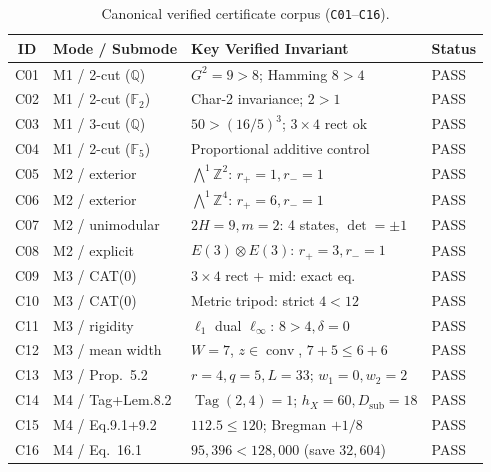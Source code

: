\documentclass[10pt,twocolumn]{article}
\begin{document}
\begin{table}[t]
\centering
\scriptsize
\setlength{\tabcolsep}{3.5pt}
\caption{Canonical verified certificate corpus (\texttt{C01}--\texttt{C16}).}
\label{tab:corpus}
\begin{tabular}{@{}clll@{}}
\toprule
ID & Mode / Submode & Key Verified Invariant & Status \\
\midrule
C01 & M1 / 2-cut ($\mathbb{Q}$) & $G^2=9>8$; Hamming $8>4$ & PASS \\
C02 & M1 / 2-cut ($\mathbb{F}_2$) & Char-2 invariance; $2>1$ & PASS \\
C03 & M1 / 3-cut ($\mathbb{Q}$) & $50 > (16/5)^3$; $3\times 4$ rect ok & PASS \\
C04 & M1 / 2-cut ($\mathbb{F}_5$) & Proportional additive control & PASS \\
C05 & M2 / exterior & $\bigwedge^1\mathbb{Z}^2$: $r_+=1, r_-=1$ & PASS \\
C06 & M2 / exterior & $\bigwedge^1\mathbb{Z}^4$: $r_+=6, r_-=1$ & PASS \\
C07 & M2 / unimodular & $2H{=}9,m{=}2$: 4 states, $\det=\pm 1$ & PASS \\
C08 & M2 / explicit & $E(3){\otimes}E(3)$: $r_+=3, r_-=1$ & PASS \\
C09 & M3 / CAT(0) & $3\times 4$ rect + mid: exact eq. & PASS \\
C10 & M3 / CAT(0) & Metric tripod: strict $4 < 12$ & PASS \\
C11 & M3 / rigidity & $\ell_1$ dual $\ell_\infty$: $8>4, \delta=0$ & PASS \\
C12 & M3 / mean width & $W=7$, $z\in\operatorname{conv}$, $7{+}5\le 6{+}6$ & PASS \\
C13 & M3 / Prop.~5.2 & $r{=}4,q{=}5,L{=}33$; $w_1{=}0,w_2{=}2$ & PASS \\
C14 & M4 / Tag+Lem.8.2 & $\operatorname{Tag}(2,4)=1$; $h_X{=}60, D_{\mathrm{sub}}{=}18$ & PASS \\
C15 & M4 / Eq.9.1+9.2 & $112.5\le 120$; Bregman $+1/8$ & PASS \\
C16 & M4 / Eq.~16.1 & $95{,}396 < 128{,}000$ (save $32{,}604$) & PASS \\
\bottomrule
\end{tabular}
\end{table}
\end{document}
